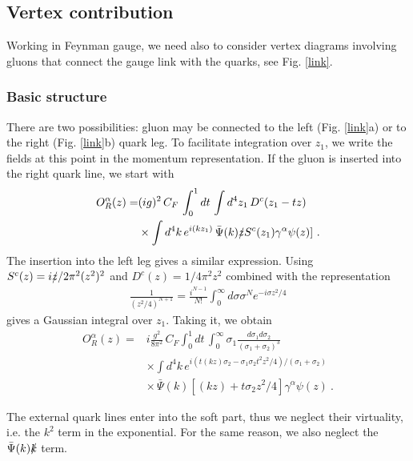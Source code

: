 \documentclass[final,5p,times,twocolumn]{elsarticle}
\begin{document}
 
\subsection{Vertex contribution} 


Working in Feynman gauge, we need also to consider   vertex diagrams
involving gluons  that connect the gauge link with the quarks, see  Fig. \ref{link}. 


 \subsubsection{Basic structure}
 



There are two possibilities: gluon may be connected to  the left  
(Fig. \ref{link}a) or to the right  (Fig. \ref{link}b) 
quark leg.  To facilitate integration over $z_1$, we write  the fields at this point 
 in the momentum representation.
If  the gluon  is inserted into the right quark  line, we start with 
   \begin{align} 
  O_R^\alpha   (z) = &  (i g)^2\,C_F \, \int_0^1 dt \, 
 \int   d^4z_1   \,D^c (z_1-tz )   
  \nonumber \\ &  \times   \int d^4 k \, e^{i (kz_1)}    \,    \bar \Psi (k)  \slashed z  S^c(z_1) \gamma^\alpha  \psi (z)   ] \  . 
    \label{gauge1}
 \end{align}
The insertion into the left    leg gives a similar expression. 
 Using $S^c (z) = i\slashed z/ 2\pi^2 (z^2)^2$ and $D^c(z) = 1/4\pi^2 z^2$ combined with the
representation
    \begin{align} 
\frac1{(z^2/4)^{N+1}} = \frac{i^{N-1}}{ N!} \int_0^\infty d \sigma \sigma^N e^{-i \sigma z^2/4} 
\label{z2N}
 \end{align}
gives a Gaussian integral   over  $z_1$. Taking it, we obtain    
 \begin{align} 
  O^\alpha_R  (z) = &i     \frac{ g^2}{8 \pi^2} \, C_F  \int_0^1 dt \, 
 \int_0^\infty \sigma_1 \frac{d\sigma_1 d \sigma_2 }{(\sigma_1 + \sigma_2)^3}
   \nonumber \\ &  \times \int d^4 k \,  e^{i  (t (k z)  \sigma_2 -
    \sigma_1  \sigma_2 t^2 z^2/4 )/(\sigma_1 + \sigma_2)} 
  \nonumber \\ &  \times  
 \,  \bar \Psi (k)   \left  [ (kz)  
   + t \sigma_2  z^2/4  \right ]   \gamma^\alpha  \psi (z)   
   \ .
  \label{RightV}
 \end{align}
 
 
 The external quark lines enter into the soft part, 
 thus we neglect their virtuality, i.e. 
 the $k^2$ term in the exponential. 
For the same reason, we   also   neglect  the $\bar \Psi (k) \slashed k$ term.  
\end{document}
